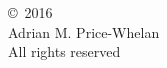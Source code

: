 \vspace*{7in}

\noindent

{
	\pagestyle{empty}
	
	\begin{center}
		\copyright\, 2016 \\
		Adrian M. Price-Whelan \\
		All rights reserved
	\end{center}
}
\clearpage
